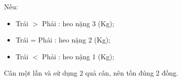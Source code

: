    Nếu:  
\begin{itemize}
	\item     Trái $>$ Phải : heo nặng 3 (Kg);   
	\item     Trái = Phải : heo nặng 2 (Kg);   
	\item     Trái $<$ Phải : heo nậng 1 (Kg);   
\end{itemize}
\begin{itemize}
\end{itemize}

   Cân một lần và sử dụng 2 quả cân, nên tốn đúng 2 đồng.  